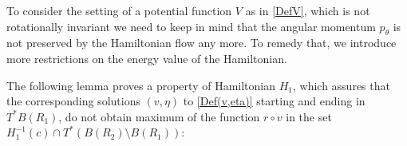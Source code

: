 \documentclass[a4paper]{amsart}
\numberwithin{equation}{section}
\newcommand{\R}{\mathbb{R}}
\newcommand{\A}{\mathcal{A}}
\newcommand{\Crit}{\operatorname{Crit}}
\begin{document}

To consider the setting of a potential function $V$ as in \eqref{DefV}, which is not rotationally invariant we need to keep in mind that the angular momentum $p_\theta$ is not preserved by the Hamiltonian flow any more. To remedy that, we introduce
more restrictions on the energy value of the Hamiltonian. 

The following lemma proves a property of Hamiltonian $H_1$, which assures that the corresponding solutions $(v,\eta)$ to \eqref{Def(v,eta)} starting and ending in $T^*B(R_1)$, do not obtain maximum of the function $r\circ v$ in the set $H_1^{-1}(c)\cap T^*(B(R_2)\setminus B(R_1))$:
\end{document}
